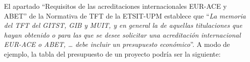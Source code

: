 \setcounter{table}{0}
\renewcommand{\thetable}{B.\arabic{table}}
\renewcommand{\theHtable}{B.\arabic{table}}

El apartado ``Requisitos de las acreditaciones internacionales EUR-ACE y ABET'' de la Normativa de TFT de la ETSIT-UPM establece que ``\textit{La memoria del TFT del GITST, GIB y MUIT, y en general la de aquellas titulaciones que hayan obtenido o para las que se desee solicitar una acreditación internacional EUR-ACE o ABET, … debe incluir un presupuesto económico}''. A modo de ejemplo, la tabla del presupuesto de un proyecto podría ser la siguiente:

\begin{table}[H]
    \centering
\end{table}
